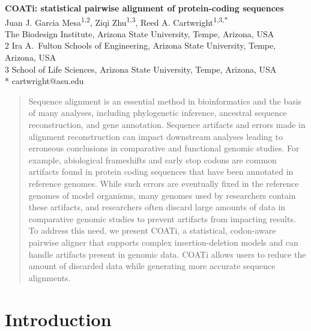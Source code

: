 \documentclass[12pt,letterpaper]{article}
\begin{document}
\begin{flushleft}
{\Large\textbf{COATi: statistical pairwise alignment of protein-coding sequences}}
\newline
\\
Juan J. Garcia Mesa\textsuperscript{1,2},
Ziqi Zhu\textsuperscript{1,3},
Reed A. Cartwright\textsuperscript{1,3,*}\\
 The Biodesign Institute, Arizona State University, Tempe, Arizona, USA\\
2 Ira A.\ Fulton Schools of Engineering, Arizona State University, Tempe, Arizona, USA\\
3 School of Life Sciences, Arizona State University, Tempe, Arizona, USA\\
\bigskip
* cartwright@asu.edu

\end{flushleft}

\begin{abstract}
\noindent
Sequence alignment is an essential method in bioinformatics and the basis of many analyses, including phylogenetic inference, ancestral sequence reconstruction, and gene annotation. Sequence artifacts and errors made in alignment reconstruction can impact downstream analyses leading to erroneous conclusions in comparative and functional genomic studies. For example, abiological frameshifts and early stop codons are common artifacts found in protein coding sequences that have been annotated in reference genomes. While such errors are eventually fixed in the reference genomes of model organisms, many genomes used by researchers contain these artifacts, and researchers often discard large amounts of data in comparative genomic studies to prevent artifacts from impacting results. To address this need, we present COATi, a statistical, codon-aware pairwise aligner that supports complex insertion-deletion models and can handle artifacts present in genomic data. COATi allows users to reduce the amount of discarded data while generating more accurate sequence alignments.
\end{abstract}

\linenumbers

\section*{Introduction}
\end{document}
